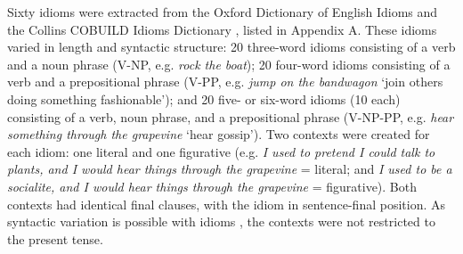 \documentclass[output=paper,modfonts,nonflat]{langsci/langscibook}
\begin{document}
Sixty idioms were extracted from the Oxford Dictionary of English Idioms \citep{OxfordIdiomsDictionary} and the Collins COBUILD Idioms Dictionary \citep{CollinsIdiomsDictionary}, listed in Appendix A. These idioms varied in length and syntactic structure: 20 three-word idioms consisting of a verb and a noun phrase (V-NP, e.g. \textit{rock the boat}); 20 four-word idioms consisting of a verb and a prepositional phrase (V-PP, e.g. \textit{jump on the bandwagon} `join others doing something fashionable'); and 20 five- or six-word idioms (10 each) consisting of a verb, noun phrase, and a prepositional phrase (V-NP-PP, e.g. \textit{hear something through the grapevine} `hear gossip'). Two contexts were created for each idiom: one literal and one figurative (e.g. \textit {I used to pretend I could talk to plants, and I would hear things through the grapevine} = literal; and \textit {I used to be a socialite, and I would hear things through the grapevine} = figurative). Both contexts had identical final clauses, with the idiom in sentence-final position. As syntactic variation is possible with idioms \citep{Moon1998, Schroder2013}, the contexts were not restricted to the present tense.
\end{document}

